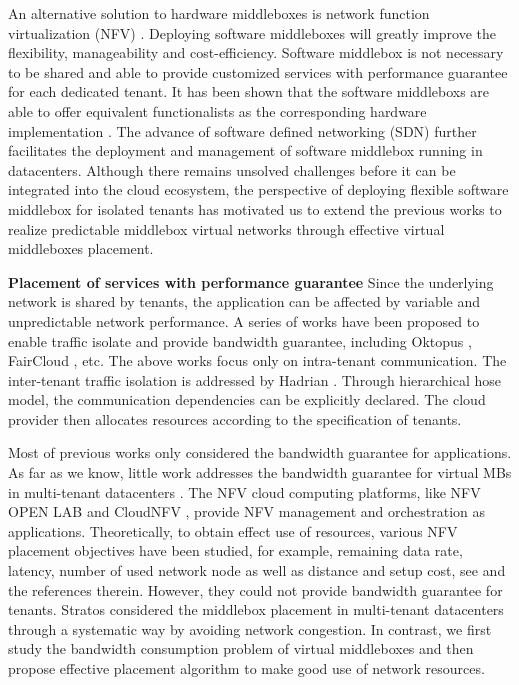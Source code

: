 \documentclass[review]{elsarticle}
\begin{document}
An alternative solution to hardware middleboxes is network function virtualization (NFV) \cite{NFV}. Deploying software middleboxes will greatly improve the flexibility, manageability and cost-efficiency. Software middlebox is not necessary to be shared and able to provide customized services with performance guarantee for each dedicated tenant. It has been shown that the software middleboxs are able to offer equivalent functionalists as the corresponding hardware implementation \cite{D12tpp, S12dai, G13dio, ClickOS}. The advance of software defined networking (SDN) further facilitates the deployment and management of software middlebox running in datacenters. Although there remains unsolved challenges before it can be integrated into the cloud ecosystem, the perspective of deploying flexible software middlebox for isolated tenants has motivated us to extend the previous works to realize predictable middlebox virtual networks through effective virtual middleboxes placement.


\textbf{Placement of services with performance guarantee}
Since the underlying network is shared by tenants, the application can be affected by variable and unpredictable network performance. A series of works have been proposed to enable traffic isolate and provide bandwidth guarantee, including Oktopus \cite{B11tpd}, FairCloud \cite{P12fst}, etc. The above works focus only on intra-tenant communication. The inter-tenant traffic isolation is addressed by Hadrian \cite{B13cta}. Through hierarchical hose model, the communication dependencies can be explicitly declared. The cloud provider then allocates resources according to the specification of tenants. 

Most of previous works only considered the bandwidth guarantee for applications. As far as we know, little work addresses the bandwidth guarantee for virtual MBs in multi-tenant datacenters \cite{7243304}. The NFV cloud computing platforms, like NFV OPEN LAB \cite{HuaweiNFV} and CloudNFV \cite{CloudNFV}, provide NFV management and orchestration as applications. Theoretically, to obtain effect use of resources, various NFV placement objectives have been studied, for example, remaining data rate, latency, number of used network node as well as distance and setup cost, see \cite{M14sap, cohen2015near} and the references therein. However, they could not provide bandwidth guarantee for tenants. Stratos \cite{stratos12} considered the middlebox placement in multi-tenant datacenters through a systematic way by avoiding network congestion. In contrast, we first study the bandwidth consumption problem of virtual middleboxes and then propose effective placement algorithm to make good use of network resources.
\end{document}
